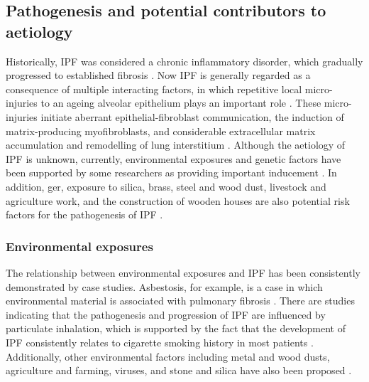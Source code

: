 \subsection{Pathogenesis and potential contributors to aetiology}
Historically, IPF was considered a chronic inflammatory disorder, which gradually progressed to established fibrosis \citep{richeldi2017idiopathic}. Now IPF is generally regarded as a consequence of multiple interacting factors, in which repetitive local micro-injuries to an ageing alveolar epithelium plays an important role \citep{richeldi2017idiopathic}. These micro-injuries initiate aberrant epithelial-fibroblast communication, the induction of matrix-producing myofibroblasts, and considerable extracellular matrix accumulation and remodelling of lung interstitium \citep{richeldi2017idiopathic}. Although the aetiology of IPF is unknown, currently,  environmental exposures and genetic factors have been supported by some researchers as providing important inducement \citep{taskar2006idiopathic,meltzer2008idiopathic,xaubet2017idiopathic,richeldi2017idiopathic}. In addition, \gls{ger}, exposure to silica, brass, steel and wood dust, livestock and agriculture work, and the construction of wooden houses are also potential risk factors for the pathogenesis of IPF \citep{taskar2006idiopathic,xaubet2017idiopathic}.

\subsubsection{Environmental exposures}
The relationship between environmental exposures and IPF has been consistently demonstrated by case studies. Asbestosis, for example, is a case in which environmental material is associated with pulmonary fibrosis \citep{meltzer2008idiopathic}. There are studies indicating that the pathogenesis and progression of IPF are influenced by particulate inhalation, which is supported by the fact that the development of IPF consistently relates to cigarette smoking history in most patients \citep{baumgartner1997cigarette,richeldi2017idiopathic}. Additionally, other environmental factors including metal and wood dusts, agriculture and farming, viruses, and stone and silica have also been proposed \citep{raghu2011official, taskar2006idiopathic}.

\newpage

